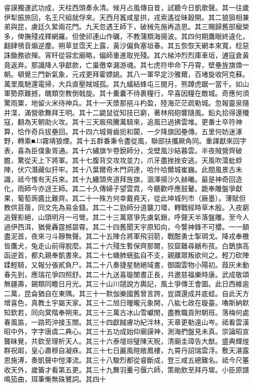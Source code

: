 \begin{pinyinscope}
睿謨獨運武功成，天柱西頭奏永清。候月占風傳自昔，試聽今日凱歌聲。其一往歲伊犁振旅回，名王尺組就俘來。天西月竁咸星拱，戎索遙從昧穀開。其二狼狽相兼弟與昆，虜廷久縶兩花門。九天忽遇王師下，破械先施再造恩。其三賜歸舊部寵榮多，俾撫殘戎釋網羅。但使祁連山作礪，不教蒲類海揚波。其四何期鷹眼終違化，翻肆鴞音煽逆塵。朔草並霑天上露，黃沙偏負塞垣春。其五恢恢天網本來寬，稔惡誅鋤務欲殫。宵旰從容宏廟略，偏師重進取兇殘。其六梯沖烈烈庫車垣，逋寇倉黃竟返奔。那識降人爭獻款，亡巢徼幸漏游魂。其七虎符申命下丹霄，壁壘旌旗煥一朝。頓覺三門新氣象，元戎更拜霍嫖姚。其八一軍早定沙雅爾，百堵旋收阿克蘇。萬里風馳還電掃，大兵直壓賊城孤。其九蟻結蜂屯三閱月，熊蹲虎踞一當千。如山軍勢原難撼，醜類空教倒戟旋。其十櫜囊不待裹糧行，早喜因糧在敵城。奇應何須驚雨粟，地留火米待神兵。其十一天漿那挹斗杓盈，陸海茫茫疏勒城。忽報靈泉隨井渫，滿營歌舞拜王明。其十二鼯鼠從知技已窮，著林飛砲響隨風。鉛丸拾得還殲寇，翻為天朝助火攻。其十三天廄飛騰萬騎來，追風已過拂雲堆。更番士卒符神算，恰作奇兵拔壘回。其十四六城脣齒扼和闐，一夕降旗因壘傳。五里何妨迷涿野，轉乘■J3霧靖狼煙。其十五群番秉令盡從風，聯部扶攜厥角同。重譯獻來回字表，喜為臣僕象胥通。其十六繡旗乍卷銳師分，戈壁風沙結暮雲。半夜賊營齊破膽，驚從天上下將軍。其十七腹背交攻攻並力，爪牙盡挫挫安逃。天風吹蕩蚍蜉陣，伏穴潛藏似犴牢。其十八葉爾奇木門洞達，哈什哈爾城崔巍。此間風景古未識，祗今惟有天兵來。其十九纏頭夾道拜旌旗，涸澤揚沙久赫曦。最是神奇回造化，雨師今亦迓王師。其二十久傳婦子望雲霓，今聽歡呼應鼓鼙。跪奉雕盤爭獻果，葡萄蒟醬比難齊。其二十一殊方何幸戴堯天，從此坤城列市（廠墨）。薄賦但教供苜蓿，同文先為易金錢。其二十二勁師分道襲刀環，轉戰經時草木殷。入夜窮追聲影絕，山頭明月一弓彎。其二十三萬眾爭先虜氣銷，呼聲天半落盤雕。至今人過伊西洱，猶覺轟霆撼碧霄。其二十四舊聞天宇原知向，今讋神鋒不可攖。一一顤盡泥首，夜來刁斗靜無聲。其二十五陣合將軍飛羽箭，戰酣勇士掣琱戈。降戎奉檄皆鷹犬，兔走山前得脫麼。其二十六殘生暫保齊那爾，狡窟難尋鶒布孩。白鵲旗高函逆首，都丸親奉凱書來。其二十七蟣肺蜣肱自不支，親離眾叛欲何之。輕刀砍陣蹂輕騎，又報分張貳負尸。其二十八奏捷星馳絕域書，御園雲物小陽初。葭灰未動春先到，應瑞花爭四照舒。其二十九送喜璇闈晝正長，共邀慈福樂時康。武成敬頌無疆壽，錫類同瞻日月光。其三十山川競說方輿記，風土爭傳王會圖。此日西維逾二萬，昆侖猶自在東隅。其三十一默伽樂國舊曾言誇，豈謂還成井底蛙。自此天方增喜色，真教土宇屬天家。其三十二旭日曈曨元象開，八紘七政在璇臺。嚕斯納默知欽若，同向蓂階奉朔來。其三十三萬古冰山雪巘閒，盡教職貢附朝班。落梅何處春風笛，一路筠沖接玉關。其三十四獻馘膚功紀泮林，天章更勒遠山岑。祗看雲漢昭中外，字字唐虞二典心。其三十五功成始仰廟謨神，測海捫盤見未真。崇論昭宣聾昧覺，共欽至理析天人。其三十六泰壇琮璧陳天貺，清廟圭璋告大猷。盛典輝煌群祝嘏，皇心肅穆自凝庥。其三十七日麗風暄敞鳳樓，九霄丹詔瑞雲浮。敷天湛露恩施溥，奏凱聲中愷澤流。其三十八駿烈都從睿斷成，登三咸五總難名。祗今尺箠收天外，歲籥才看第五更。其三十九舞羽櫜弓偃六師，策勛飲至拜丹墀。小臣原譜鳴笳曲，珥筆慚無硃鷺詞。其四十


\end{pinyinscope}
